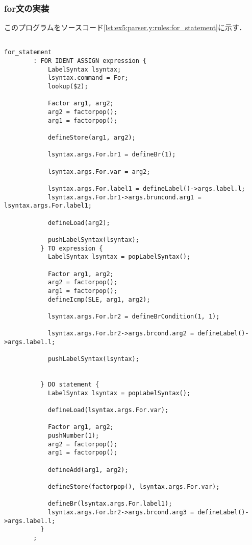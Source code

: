 \documentclass[uplatex]{jsarticle}
\begin{document}
\subsubsection{for文の実装}
このプログラムをソースコード\ref{lst:ex5:parser.y:rules:for_statement}に示す．
\begin{lstlisting}[caption=for文の処理,label=lst:ex5:parser.y:rules:for_statement]

for_statement
        : FOR IDENT ASSIGN expression {
            LabelSyntax lsyntax;
            lsyntax.command = For;
            lookup($2);

            Factor arg1, arg2;
            arg2 = factorpop();
            arg1 = factorpop();

            defineStore(arg1, arg2);

            lsyntax.args.For.br1 = defineBr(1);

            lsyntax.args.For.var = arg2;

            lsyntax.args.For.label1 = defineLabel()->args.label.l;
            lsyntax.args.For.br1->args.bruncond.arg1 = lsyntax.args.For.label1;

            defineLoad(arg2);

            pushLabelSyntax(lsyntax);
          } TO expression {
            LabelSyntax lsyntax = popLabelSyntax();

            Factor arg1, arg2;
            arg2 = factorpop();
            arg1 = factorpop();
            defineIcmp(SLE, arg1, arg2);

            lsyntax.args.For.br2 = defineBrCondition(1, 1);

            lsyntax.args.For.br2->args.brcond.arg2 = defineLabel()->args.label.l;

            pushLabelSyntax(lsyntax);


          } DO statement {
            LabelSyntax lsyntax = popLabelSyntax();

            defineLoad(lsyntax.args.For.var);

            Factor arg1, arg2;
            pushNumber(1);
            arg2 = factorpop();
            arg1 = factorpop();

            defineAdd(arg1, arg2);

            defineStore(factorpop(), lsyntax.args.For.var);

            defineBr(lsyntax.args.For.label1);
            lsyntax.args.For.br2->args.brcond.arg3 = defineLabel()->args.label.l;
          }
        ;
\end{lstlisting}
\end{document}
